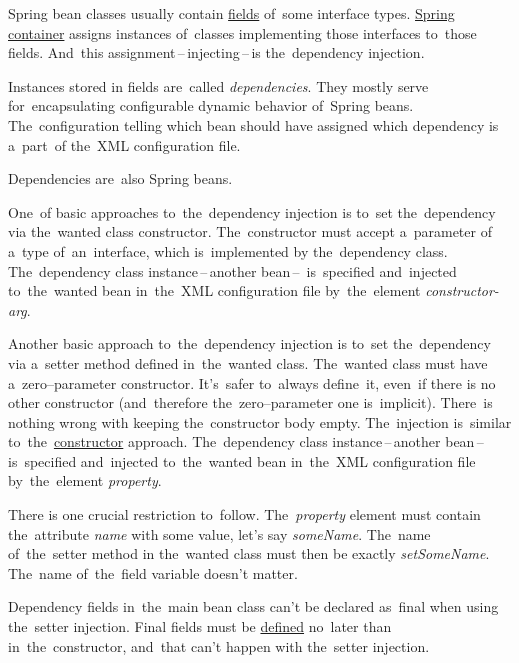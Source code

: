 \label{springdependencyinjection}
Spring bean classes usually contain \hyperref[variablefieldproperty]{fields} of~some interface types. \hyperref[springcontainrer]{Spring container} assigns instances of~classes implementing those interfaces to~those fields. And~this assignment\,--\,injecting\,--\,is the~dependency injection.

Instances stored in fields are~called \textit{dependencies}. They mostly serve for~encapsulating configurable dynamic behavior of~Spring beans. The~configuration telling which bean should have assigned which dependency is a~part~of the~XML configuration file.

\note Dependencies are~also Spring beans.

\label{constructorinjection}
One~of basic approaches to~the~dependency injection is to~set the~dependency via the~wanted class constructor. The~constructor must accept a~parameter of a~type of~an~interface, which is~implemented by the~dependency class. The~dependency class instance\,--\,another bean\,--\, is~specified and~injected to~the~wanted bean in~the~XML configuration file by~the~element \textit{constructor-arg}.

\label{setterinjection}
Another basic approach to~the~dependency injection is to~set the~dependency via a~setter method defined in~the~wanted class. The~wanted class must have a~zero--parameter constructor. It's~safer to~always define~it, even~if there is no other constructor (and~therefore the~zero--parameter one is~implicit). There~is nothing wrong with keeping the~constructor body empty. The~injection is~similar to~the~\hyperref[constructorinjection]{constructor} approach. The~dependency class instance\,--\,another bean\,--\, is~specified and~injected to~the~wanted bean in~the~XML configuration file by~the~element \textit{property}.

\warning There is one crucial restriction to~follow. The~\textit{property} element must contain the~attribute \textit{name} with some value, let's say \textit{someName}. The~name of~the~setter method in the~wanted class must then be exactly \textit{setSomeName}. The~name of~the~field variable doesn't matter.

\warning Dependency fields in~the~main bean class can't be declared as~final when using the~setter injection. Final fields must be \hyperref[declarationdefinition]{defined} no~later than in~the~constructor, and~that can't happen with the~setter injection.

